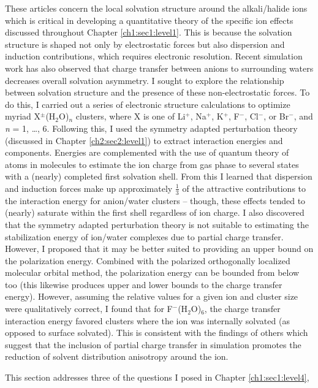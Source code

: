\begin{sie}
  These articles concern the local solvation structure around the alkali/halide ions which is critical in developing a quantitative 
  theory of the specific ion effects discussed throughout Chapter \ref{ch1:sec1:level1}. This is because the solvation structure is
  shaped not only by electrostatic forces but also dispersion and induction contributions, which requires electronic resolution. Recent 
  simulation work has also observed that charge transfer between anions to surrounding waters decreases overall solvation asymmetry. 
  I sought to explore the relationship between solvation structure and the presence of these non-electrostatic forces. To do this, I 
  carried out a series of electronic structure calculations to optimize myriad X$^{\pm}$(H$_{2}$O)$_{n}$ clusters, where X is one of 
  Li$^{+}$, Na$^{+}$, K$^{+}$, F$^{-}$, Cl$^{-}$, or Br$^{-}$, and \emph{n} = 1, \dots, 6. Following this, I used the symmetry adapted 
  perturbation theory (discussed in Chapter \ref{ch2:sec2:level1}) to extract interaction energies and components. Energies are complemented
  with the use of quantum theory of atoms in molecules to estimate the ion charge from gas phase to several states with a (nearly) 
  completed first solvation shell. From this I learned that dispersion and induction forces make up approximately $\frac{1}{3}$ of
  the attractive contributions to the interaction energy for anion/water clusters -- though, these effects tended to (nearly) saturate
  within the first shell regardless of ion charge. I also discovered that the symmetry adapted perturbation theory is not suitable to 
  estimating the stabilization energy of ion/water complexes due to partial charge transfer. However, I proposed that it may be better 
  suited to providing an upper bound on the polarization energy. Combined with the polarized orthogonally localized molecular orbital
  method, the polarization energy can be bounded from below too (this likewise produces upper and lower bounds to the charge transfer 
  energy). However, assuming the relative values for a given ion and cluster size were qualitatively correct, I found that for 
  F$^{-}$(H$_{2}$O)$_{6}$, the charge transfer interaction energy favored clusters where the ion was internally solvated (as opposed
  to surface solvated). This is consistent with the findings of others which suggest that the inclusion of partial charge transfer 
  in simulation promotes the reduction of solvent distribution anisotropy around the ion.
  
  This section addresses three of the questions I posed in Chapter \ref{ch1:sec1:level4},


\end{sie}
